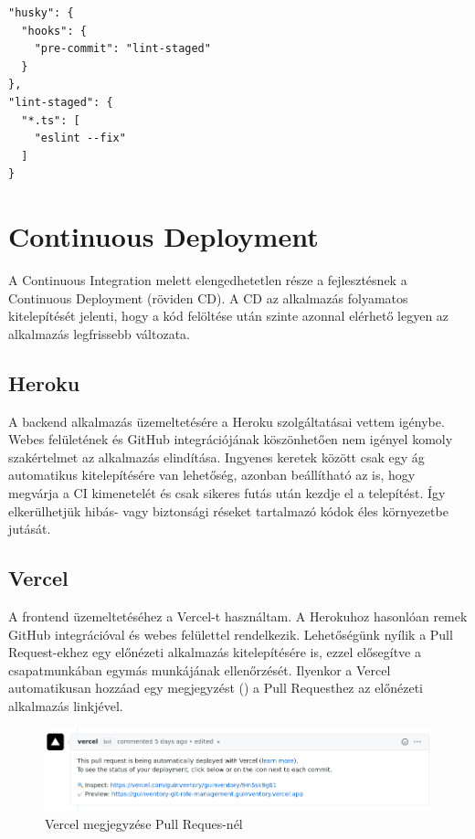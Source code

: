 \begin{lstlisting}[style=ES6, caption=Pre-commit hook beállításai]    
"husky": {
  "hooks": {
    "pre-commit": "lint-staged"
  }
},
"lint-staged": {
  "*.ts": [
    "eslint --fix"
  ]
}
\end{lstlisting}
  

\section{Continuous Deployment}
A Continuous Integration melett elengedhetetlen része a fejlesztésnek a Continuous Deployment (röviden CD).
A CD az alkalmazás folyamatos kitelepítését jelenti, hogy a kód felöltése után szinte azonnal elérhető legyen az alkalmazás legfrissebb változata.


\subsection{Heroku}
A backend alkalmazás üzemeltetésére a Heroku szolgáltatásai vettem igénybe.
Webes felületének és GitHub integrációjának köszönhetően nem igényel komoly szakértelmet az alkalmazás elindítása.
Ingyenes keretek között csak egy ág automatikus kitelepítésére van lehetőség, azonban beállítható az is, hogy megvárja a CI kimenetelét és csak sikeres futás után kezdje el a telepítést.
Így elkerülhetjük hibás- vagy biztonsági réseket tartalmazó kódok éles környezetbe jutását.


\subsection{Vercel}
A frontend üzemeltetéséhez a Vercel-t használtam. 
A Herokuhoz hasonlóan remek GitHub integrációval és webes felülettel rendelkezik. 
Lehetőségünk nyílik a Pull Request-ekhez egy előnézeti alkalmazás kitelepítésére is, ezzel elősegítve a csapatmunkában egymás munkájának ellenőrzését.
Ilyenkor a Vercel automatikusan hozzáad egy megjegyzést () a Pull Requesthez az előnézeti alkalmazás linkjével.

\begin{figure}[!ht]
  \centering
  \includegraphics[width=150mm, keepaspectratio]{figures/vercel.png}
  \caption{Vercel megjegyzése Pull Reques-nél}
  \label{fig:vercel}
\end{figure}


